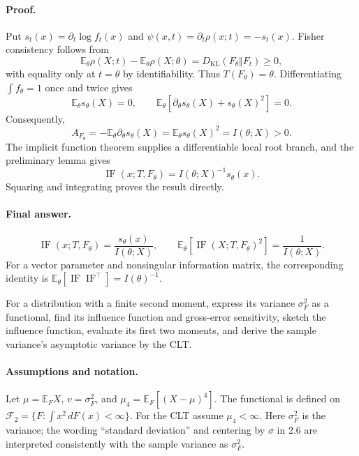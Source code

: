 \documentclass[answers,12pt,addpoints]{exam}
\providecommand{\E}{\mathbb{E}}
\providecommand{\IF}{\operatorname{IF}}
\begin{document}
\begin{questions}
\begin{solution}
\paragraph{Proof.}
Put $s_t(x)=\partial_t\log f_t(x)$ and
$\psi(x,t)=\partial_t\rho(x;t)=-s_t(x)$. Fisher consistency follows
from
\[
\E_\theta\rho(X;t)-\E_\theta\rho(X;\theta)
=D_{\mathrm{KL}}(F_\theta\Vert F_t)\geq0,
\]
with equality only at $t=\theta$ by identifiability.
Thus $T(F_\theta)=\theta$.
Differentiating $\int f_\theta=1$ once and twice gives
\[
\E_\theta s_\theta(X)=0,
\qquad
\E_\theta[\partial_\theta s_\theta(X)+s_\theta(X)^2]=0.
\]
Consequently,
\[
A_{F_\theta}
=-\E_\theta\partial_\theta s_\theta(X)
=\E_\theta s_\theta(X)^2=I(\theta;X)>0.
\]
The implicit function theorem supplies a differentiable local root
branch, and the preliminary lemma gives
\[
\IF(x;T,F_\theta)=I(\theta;X)^{-1}s_\theta(x).
\]
Squaring and integrating proves the result directly.

\paragraph{Final answer.}
\[
\boxed{\IF(x;T,F_\theta)=\frac{s_\theta(x)}{I(\theta;X)},
\qquad
\E_\theta[\IF(X;T,F_\theta)^2]=\frac1{I(\theta;X)}.}
\]
For a vector parameter and nonsingular information matrix, the
corresponding identity is
$\E_\theta[\IF\IF^\top]=I(\theta)^{-1}$.
\end{solution}

\question
For a distribution with a finite second moment, express its variance
$\sigma_F^2$ as a functional, find its influence function and
gross-error sensitivity, sketch the influence function, evaluate its
first two moments, and derive the sample variance's asymptotic
variance by the CLT.

\begin{solution}
\paragraph{Assumptions and notation.}
Let $\mu=\E_FX$, $v=\sigma_F^2$, and
$\mu_4=\E_F[(X-\mu)^4]$. The functional is defined on
$\mathcal F_2=\{F:\int x^2\,dF(x)<\infty\}$.
For the CLT assume $\mu_4<\infty$.
Here $\sigma_F^2$ is the variance; the wording ``standard deviation''
and centering by $\sigma$ in 2.6 are interpreted consistently with
the sample variance as $\sigma_F^2$.


\end{solution}
\end{questions}
\end{document}
